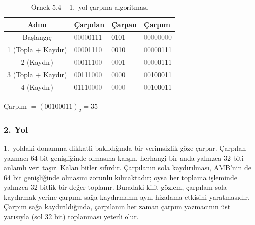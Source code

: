 \begin{ornek}[5.4]
\begin{table}[H]
\centering
\caption{Örnek 5.4 -- 1.\ yol çarpma algoritması}
\label{tab:carpma1-ornek}
\small
\begin{tabular}{c l l l}
\toprule
\textbf{Adım} & \textbf{\textcolor{vurgumavi}{Çarpılan}} & \textbf{\textcolor{vurgukirmizi}{Çarpan}} & \textbf{\textcolor{vurguyesil}{Çarpım}} \\
\midrule
Başlangıç & \textcolor{gray}{0000}\textcolor{vurgumavi}{0111} & \textcolor{vurgukirmizi}{0101} & \textcolor{gray}{00000000} \\
1 (Topla + Kaydır) & \textcolor{gray}{000}\textcolor{vurgumavi}{0111}\textcolor{gray}{0} & \textcolor{gray}{0}\textcolor{vurgukirmizi}{010} & \textcolor{gray}{0000}\textcolor{vurguyesil}{0111} \\
2 (Kaydır) & \textcolor{gray}{00}\textcolor{vurgumavi}{0111}\textcolor{gray}{00} & \textcolor{gray}{00}\textcolor{vurgukirmizi}{01} & \textcolor{gray}{0000}\textcolor{vurguyesil}{0111} \\
3 (Topla + Kaydır) & \textcolor{gray}{0}\textcolor{vurgumavi}{0111}\textcolor{gray}{000} & \textcolor{gray}{000}\textcolor{vurgukirmizi}{0} & \textcolor{gray}{00}\textcolor{vurguyesil}{100011} \\
4 (Kaydır) & \textcolor{vurgumavi}{0111}\textcolor{gray}{0000} & \textcolor{gray}{0000} & \textcolor{gray}{00}\textcolor{vurguyesil}{100011} \\
\bottomrule
\end{tabular}
\end{table}

Çarpım $= (00100011)_2 = 35$
\end{ornek}

\subsubsection{2. Yol}

1.\ yoldaki donanıma dikkatli bakıldığında bir verimsizlik göze çarpar. Çarpılan yazmacı 64 bit genişliğinde olmasına karşın, herhangi bir anda yalnızca 32 biti anlamlı veri taşır. Kalan bitler sıfırdır. Çarpılanın sola kaydırılması, AMB'nin de 64 bit genişliğinde olmasını zorunlu kılmaktadır; oysa her toplama işleminde yalnızca 32 bitlik bir değer toplanır. Buradaki kilit gözlem, çarpılanı sola kaydırmak yerine çarpımı sağa kaydırmanın aynı hizalama etkisini yaratmasıdır. Çarpım sağa kaydırıldığında, çarpılanın her zaman çarpım yazmacının üst yarısıyla (sol 32 bit) toplanması yeterli olur.

